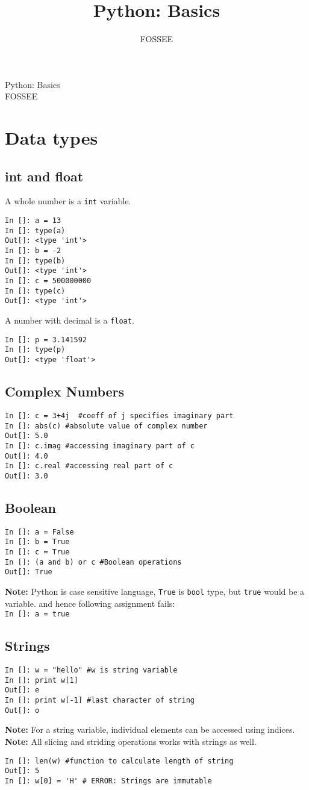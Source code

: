 \documentclass[12pt]{article}
\title{Python: Basics}
\author{FOSSEE}
\newcommand{\typ}[1]{\lstinline{#1}}
\begin{document}
\date{}
\vspace{-1in}
\begin{center}
\LARGE{Python: Basics}\\
\large{FOSSEE}
\end{center}
\section{Data types}
\subsection{int and float}
A whole number is a \typ{int} variable.
\begin{lstlisting}
In []: a = 13
In []: type(a)
Out[]: <type 'int'>
In []: b = -2
In []: type(b)
Out[]: <type 'int'>
In []: c = 500000000
In []: type(c)
Out[]: <type 'int'>
\end{lstlisting}
A number with decimal is a \typ{float}.
\begin{lstlisting}
In []: p = 3.141592
In []: type(p)
Out[]: <type 'float'>
\end{lstlisting}
\subsection{Complex Numbers}
\begin{lstlisting}
In []: c = 3+4j  #coeff of j specifies imaginary part
In []: abs(c) #absolute value of complex number
Out[]: 5.0
In []: c.imag #accessing imaginary part of c
Out[]: 4.0
In []: c.real #accessing real part of c
Out[]: 3.0
\end{lstlisting}
\newpage
\subsection{Boolean}
\begin{lstlisting}     
In []: a = False
In []: b = True
In []: c = True
In []: (a and b) or c #Boolean operations
Out[]: True
\end{lstlisting}
\textbf{Note:} Python is case sensitive language, \typ{True} is \typ{bool} type, but \typ{true} would be a variable. and hence following assignment fails:\\
\typ{In []: a = true}\\
\subsection{Strings}
  \begin{lstlisting}
In []: w = "hello" #w is string variable
In []: print w[1]
Out[]: e
In []: print w[-1] #last character of string
Out[]: o
  \end{lstlisting}
\textbf{Note:} For a string variable, individual elements can be accessed using indices.\\
\textbf{Note:} All slicing and striding operations works with strings as well.
  \begin{lstlisting}
In []: len(w) #function to calculate length of string
Out[]: 5
In []: w[0] = 'H' # ERROR: Strings are immutable 
  \end{lstlisting}
\end{document}
